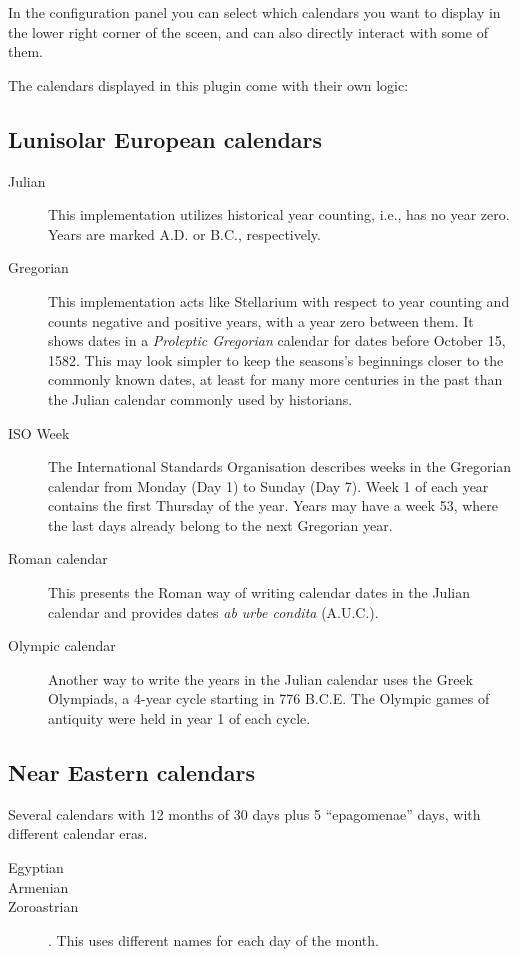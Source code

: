 In the configuration panel you can select which calendars you want to
display in the lower right corner of the sceen, and can also directly
interact with some of them.


The calendars displayed in this plugin come with their own logic:

\subsection{Lunisolar European calendars}
\begin{description}
\item[Julian] This implementation utilizes historical year counting,
  i.e., has no year zero. Years are marked A.D. or B.C., respectively.
\item[Gregorian] This implementation acts like Stellarium with respect
  to year counting and counts negative and positive years, with a year
  zero between them. It shows dates in a \emph{Proleptic Gregorian}
  calendar for dates before October 15, 1582. This may look simpler to
  keep the seasons's beginnings closer to the commonly known dates, at
  least for many more centuries in the past than the Julian calendar
  commonly used by historians.
\item[ISO Week] The International Standards Organisation describes
  weeks in the Gregorian calendar from Monday (Day 1) to Sunday (Day
  7). Week 1 of each year contains the first Thursday of the
  year. Years may have a week 53, where the last days already belong
  to the next Gregorian year.
\item[Roman calendar] This presents the Roman way of writing calendar
  dates in the Julian calendar and provides dates \emph{ab urbe condita} (A.U.C.).
\item[Olympic calendar] Another way to write the years in the Julian
  calendar uses the Greek Olympiads, a 4-year cycle starting in 776
  B.C.E. The Olympic games of antiquity were held in year 1 of each cycle.
\end{description}

\subsection{Near Eastern calendars}
Several calendars with 12 months of 30 days plus 5 ``epagomenae''
days, with different calendar eras.
\begin{description}
\item[Egyptian]
\item[Armenian]
\item[Zoroastrian]. This uses different names for each day of the month.
\end{description}

